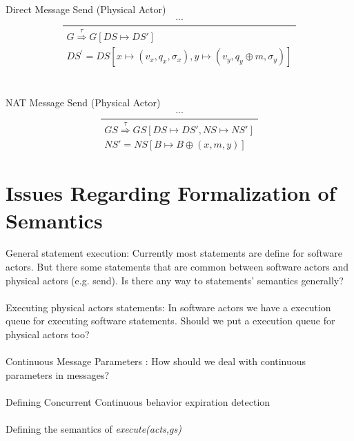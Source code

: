 \documentclass[]{article}
\begin{document}
\\\\
Direct Message Send (Physical Actor)
\begin{equation}
\frac
{
	\begin{gathered}
	...
	\end{gathered}
}
{
	\begin{gathered}
	G\overset{\tau}{\Rightarrow}G[DS\longmapsto DS'] \\
	DS^{'}=DS[x \longmapsto(v_x,q_x,\sigma_x),y\longmapsto(v_y,q_y \oplus m,\sigma_y) ]
	\end{gathered}
}
\end{equation}
\\\\
NAT Message Send (Physical Actor)
\begin{equation}
\frac
{
	\begin{gathered}
	...
	\end{gathered}
}
{
	\begin{gathered}
	GS\overset{\tau}{\Rightarrow}GS[DS\longmapsto DS', NS\longmapsto NS'] \\
	NS' = NS[B\longmapsto B \oplus (x,m,y)]
	\end{gathered}
}
\end{equation}

\section{Issues Regarding Formalization of Semantics}
General statement execution: Currently most statements are define for software actors. But there some statements that are common between software actors and physical actors (e.g. send). Is there any way to statements' semantics generally? \\ \\
Executing physical actors statements: In software actors we have a execution queue for executing software statements. Should we put a execution queue for physical actors too?\\ \\
Continuous Message Parameters : How should we deal with continuous parameters in messages? \\ \\
Defining  Concurrent Continuous behavior expiration detection \\ \\
Defining the semantics of \textit{execute(acts,gs)} \\\\
\end{document}
